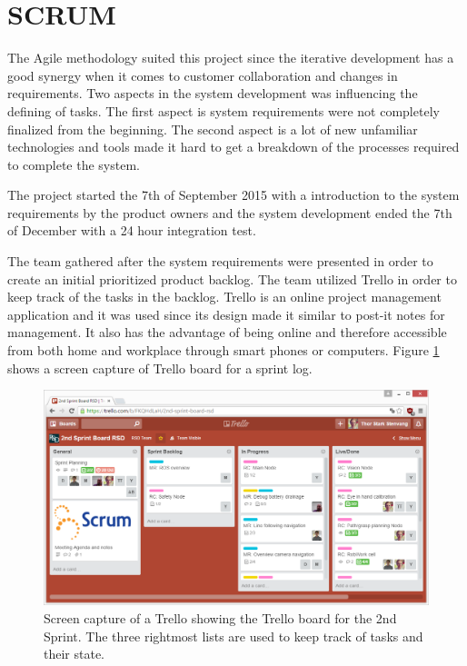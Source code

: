 \section{SCRUM \label{sec:scrum}}


The Agile methodology suited this project since the iterative development has a good synergy when it comes to customer collaboration and changes in requirements. Two aspects in the system development was influencing the defining of tasks. The first aspect is system requirements were not completely finalized from the beginning. The second aspect is a lot of new unfamiliar technologies and tools made it hard to get a breakdown of the processes required to complete the system.

The project started the 7th of September 2015 with a introduction to the system requirements by the product owners and the system development ended the 7th of December with a 24 hour integration test.

The team gathered after the system requirements were presented in order to create an initial prioritized product backlog. The team utilized Trello \citep{trello} in order to keep track of the tasks in the backlog. Trello is an online project management application and it was used since its design made it similar to post-it notes for management. It also has the advantage of being online and therefore accessible from both home and workplace through smart phones or computers. Figure \ref{fig:trello_cap} shows a screen capture of Trello board for a sprint log.
\begin{figure}[H]
	\centering
	\includegraphics[width=\textwidth]{figs/trello_example.png}
	\caption{Screen capture of a Trello showing the Trello board for the 2nd Sprint. The three rightmost lists are used to keep track of tasks and their state.}
	\label{fig:trello_cap}
\end{figure}

